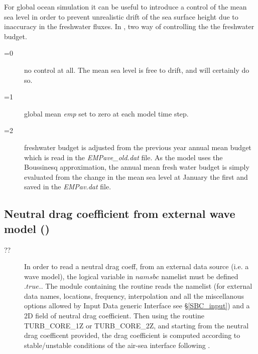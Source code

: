 For global ocean simulation it can be useful to introduce a control of the mean sea 
level in order to prevent unrealistic drift of the sea surface height due to inaccuracy 
in the freshwater fluxes. In \NEMO, two way of controlling the the freshwater budget. 
\begin{description}
\item[=0]  no control at all. The mean sea level is free to drift, and will 
certainly do so.
\item[=1]  global mean \textit{emp} set to zero at each model time step. 
\item[=2]  freshwater budget is adjusted from the previous year annual 
mean budget which is read in the \textit{EMPave\_old.dat} file. As the model uses the 
Boussinesq approximation, the annual mean fresh water budget is simply evaluated 
from the change in the mean sea level at January the first and saved in the 
\textit{EMPav.dat} file. 
\end{description}

\subsection   [Neutral drag coefficient from external wave model (\textit{sbcwave})]
                        {Neutral drag coefficient from external wave model ()}
\label{SBC_wave}
\begin{description}

\item [??] In order to read a neutral drag coeff, from an external data source (i.e. a wave model), the 
logical variable 
 in $namsbc$ namelist must be defined ${.true.}$. 
The  module containing the routine  reads the
namelist  (for external data names, locations, frequency, interpolation and all 
the miscellanous options allowed by Input Data generic Interface see \S\ref{SBC_input}) 
and a 2D field of neutral drag coefficient. Then using the routine 
TURB\_CORE\_1Z or TURB\_CORE\_2Z, and starting from the neutral drag coefficent provided, the drag coefficient is computed according 
to stable/unstable conditions of the air-sea interface following \citet{Large_Yeager_Rep04}.

\end{description}

